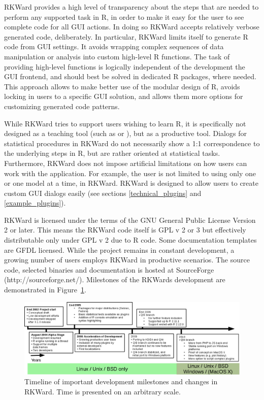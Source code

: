 RKWard provides a high level of transparency about the steps that are needed to
perform any supported task in R, in order to make it easy for the user to see
complete code for all GUI actions. In doing so RKWard accepts relatively verbose
generated code, deliberately. In particular, RKWard limits itself to generate R
code from GUI settings. It avoids wrapping complex sequences of data
manipulation or analysis into custom high-level R functions. The task of
providing high-level functions is logically independent of the development the
GUI frontend, and should best be solved in dedicated R packages, where needed.
This approach allows to make better use of the modular design of R, avoids
locking in users to a specific GUI solution, and allows them more options for
customizing generated code patterns.

While RKWard tries to support users wishing to learn R, it is specifically not
designed as a teaching tool (such as  or ), but as
a productive tool. Dialogs for statistical procedures in RKWard do not
necessarily show a 1:1 correspondence to the underlying steps in R, but are
rather oriented at statistical tasks. Furthermore, RKWard does not impose
artificial limitations on how users can work with the application. For example,
the user is not limited to using only one  or one model at a
time, in RKWard. RKWard is designed to allow users to create custom GUI dialogs
easily (see sections \ref{technical_plugins} and \ref{example_plugins}).

RKWard is licensed under the terms of the GNU General Public License Version 2
or later. This means the RKWard code itself is GPL v 2 or 3 but effectively
distributable only under GPL v 2 due to R code. Some documentation templates are
GFDL licensed. While the project remains in constant development, a growing
number of users employs RKWard in productive scenarios. The source code,
selected binaries and documentation is hosted at SourceForge
(http://sourceforge.net/). Milestones of the RKWards development are
demonstrated in Figure~\ref{fig:timeline}.

\begin{figure}[htp]
 \centering
 \includegraphics{../figures/timeline.png}
 \caption{Timeline of important development milestones and changes in RKWard.
          Time is presented on an arbitrary scale.}
 \label{fig:timeline}
\end{figure}


